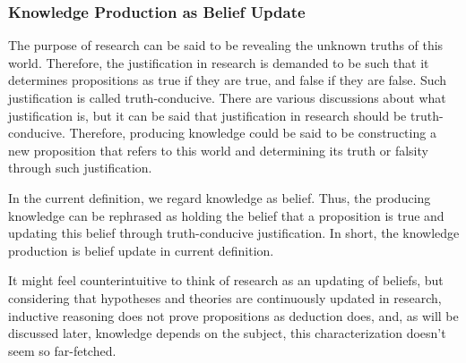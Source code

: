 \subsubsection{Knowledge Production as Belief Update}
The purpose of research can be said to be revealing the unknown truths of this world. Therefore, the justification in research is demanded to be such that it determines propositions as true if they are true, and false if they are false. Such justification is called truth-conducive. There are various discussions about what justification is, but it can be said that justification in research should be truth-conducive. Therefore, producing knowledge could be said to be constructing a new proposition that refers to this world and determining its truth or falsity through such justification. 

In the current definition, we regard knowledge as belief. Thus, the producing knowledge can be rephrased as holding the belief that a proposition is true and updating this belief through truth-conducive 
justification. In short, the knowledge production is belief update in current definition.

It might feel counterintuitive to think of research as an updating of beliefs, but considering that hypotheses and theories are continuously updated in research, inductive reasoning does not prove propositions as deduction does, and, as will be discussed later, knowledge depends on the subject, this characterization doesn't seem so far-fetched. 






